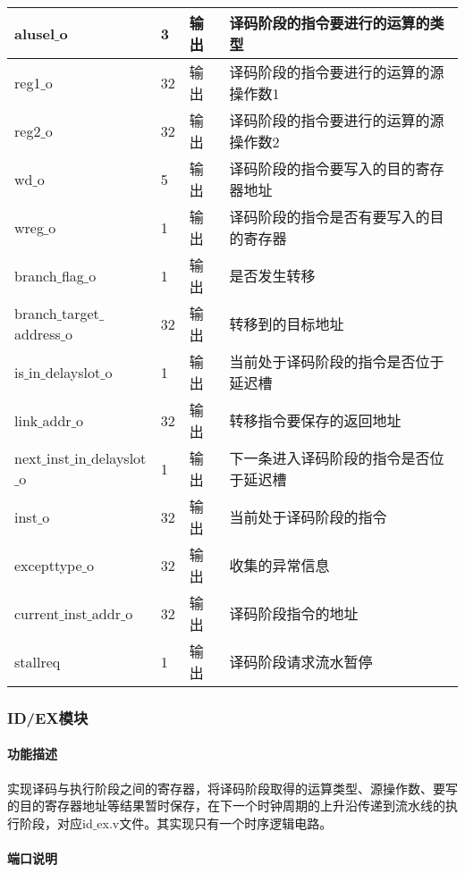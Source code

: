 \begin{longtable}{|l|l|l|l|}
		\hline
		alusel$\_$o & 3 & 输出 & 译码阶段的指令要进行的运算的类型 \\
		\hline
		reg1$\_$o & 32 & 输出 & 译码阶段的指令要进行的运算的源操作数1 \\
		\hline
		reg2$\_$o & 32 & 输出 & 译码阶段的指令要进行的运算的源操作数2 \\
		\hline
		wd$\_$o & 5 & 输出 & 译码阶段的指令要写入的目的寄存器地址 \\
		\hline
		wreg$\_$o & 1 & 输出 & 译码阶段的指令是否有要写入的目的寄存器 \\
		\hline
		branch$\_$flag$\_$o & 1 & 输出 & 是否发生转移 \\
		\hline
		branch$\_$target$\_$address$\_$o & 32 & 输出 & 转移到的目标地址 \\
		\hline
		is$\_$in$\_$delayslot$\_$o & 1 & 输出 & 当前处于译码阶段的指令是否位于延迟槽 \\
		\hline
		link$\_$addr$\_$o & 32 & 输出 & 转移指令要保存的返回地址 \\
		\hline
		next$\_$inst$\_$in$\_$delayslot$\_$o & 1 & 输出 & 下一条进入译码阶段的指令是否位于延迟槽 \\
		\hline
		inst$\_$o & 32 & 输出 & 当前处于译码阶段的指令 \\
		\hline
		excepttype$\_$o & 32 & 输出 & 收集的异常信息 \\
		\hline
		current$\_$inst$\_$addr$\_$o & 32 & 输出 & 译码阶段指令的地址 \\
		\hline
		stallreq & 1 & 输出 & 译码阶段请求流水暂停 \\
		\hline
	\end{longtable}
\subsubsection{ID/EX模块}
\paragraph{功能描述}
\quad

\quad

实现译码与执行阶段之间的寄存器，将译码阶段取得的运算类型、源操作数、要写的目的寄存器地址等结果暂时保存，在下一个时钟周期的上升沿传递到流水线的执行阶段，对应id$\_$ex.v文件。其实现只有一个时序逻辑电路。
\paragraph{端口说明}
\quad

